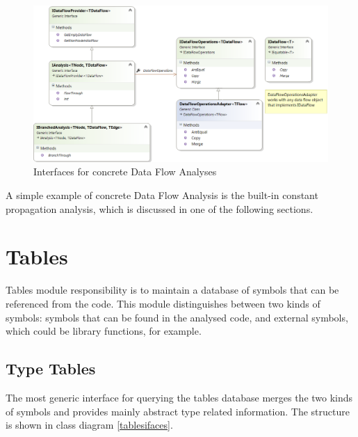 \begin{figure}[h]  
  \centering
    \includegraphics*[width=\textwidth,height=\textheight,keepaspectratio]{img/dataflow-ifaces.png}  
    \caption{Interfaces for concrete Data Flow Analyses\label{dataflowifaces}}
\end{figure}

        A simple example of concrete Data Flow Analysis is the built-in 
        constant propagation analysis, which is discussed in one of the 
        following sections.
        
    \section{Tables}
        Tables module responsibility is to maintain a database 
        of symbols that can be referenced from the code. 
        This module distinguishes between two kinds of symbols: 
        symbols that can be found in the analysed code, and external 
        symbols, which could be library functions, for example.
        
        \subsection{Type Tables}
        
        The most generic interface  for querying 
        the tables database merges the two kinds of symbols 
        and provides mainly abstract type related information. 
        The structure is shown in class diagram \ref{tablesifaces}.
        
